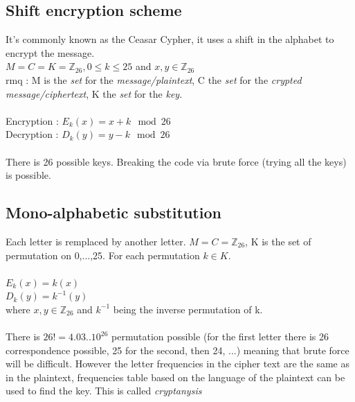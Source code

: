 \documentclass[11pt,a4paper]{report}
\begin{document}
\subsection{Shift encryption scheme}
It's commonly known as the Ceasar Cypher, it uses a shift in the alphabet to encrypt the message.\\
$M = C = K = \mathbb{Z}_{26}, 0 \leq k \leq 25$ and $x,y \in \mathbb{Z}_26$\\
rmq : M is the \emph{set} for the \emph{message/plaintext}, C the \emph{set} for the \emph{crypted message/ciphertext}, K the \emph{set} for the \emph{key}.\\
\\
Encryption : $E_k(x) = x + k \mod 26$\\
Decryption : $D_k(y) = y - k \mod 26$\\
\\
There is 26 possible keys. Breaking the code via brute force (trying all the keys) is possible.

\subsection{Mono-alphabetic substitution}
Each letter is remplaced by another letter.
$M = C = \mathbb{Z}_{26}$, K is the set of permutation on {0,...,25}. For each permutation $k\in K$.\\
\\
$E_k(x) = k(x)$\\
$D_k(y) = k^{-1}(y)$\\
where $x,y \in \mathbb{Z}_{26}$ and $k^{-1}$ being the inverse permutation of k.\\
\\
There is $26! = 4.03.. 10^{26}$ permutation possible (for the first letter there is 26 correspondence possible, 25 for the second, then 24, ...) meaning that brute force will be difficult. However the letter frequencies in the cipher text are the same as in the plaintext, frequencies table based on the language of the plaintext can be used to find the key.
This is called \emph{cryptanysis}
\end{document}
